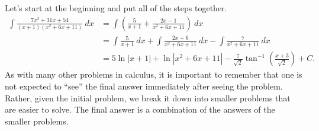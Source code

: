 {Let's start at the beginning and put all of the steps together.
\small\begin{align*}
\int\frac{7x^2+31x+54}{(x+1)(x^2+6x+11)}\ dx &= \int\left(\frac{5}{x+1} + \frac{2x-1}{x^2+6x+11}\right)\ dx \\
			&= \int\frac{5}{x+1}\ dx  + \int\frac{2x+6}{x^2+6x+11}\ dx -\int\frac{7}{x^2+6x+11}\ dx \\
			&= 5\ln|x+1|+ \ln|x^2+6x+11| -\frac{7}{\sqrt{2}}\tan^{-1}\left(\frac{x+3}{\sqrt{2}}\right)+C.
\end{align*}\normalsize
As with many other problems in calculus, it is important to remember that one is not expected to ``see'' the final answer immediately after seeing the problem. Rather, given the initial problem, we break it down into smaller problems that are easier to solve. The final answer is a combination of the answers of the smaller problems.
}\\


